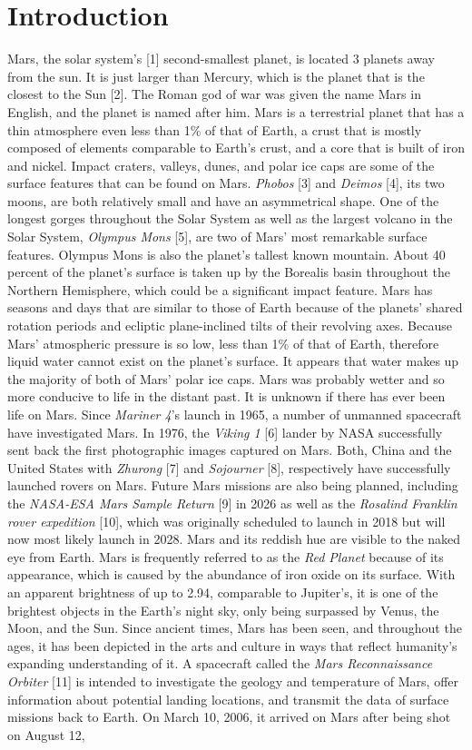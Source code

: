\documentclass[conference]{IEEEtran}
\begin{document}
\section{Introduction}
Mars, the solar system's [1] second-smallest planet, is located 3 planets away from the sun. It is just larger than Mercury, which is the planet that is the closest to the Sun [2]. The Roman god of war was given the name Mars in English, and the planet is named after him. Mars is a terrestrial planet that has a thin atmosphere even less than 1\% of that of Earth, a crust that is mostly composed of elements comparable to Earth's crust, and a core that is built of iron and nickel. Impact craters, valleys, dunes, and polar ice caps are some of the surface features that can be found on Mars. \textit{Phobos} [3] and \textit{Deimos} [4], its two moons, are both relatively small and have an asymmetrical shape. One of the longest gorges throughout the Solar System as well as the largest volcano in the Solar System, \textit{Olympus Mons} [5], are two of Mars' most remarkable surface features. Olympus Mons is also the planet's tallest known mountain. About 40 percent of the planet's surface is taken up by the Borealis basin throughout the Northern Hemisphere, which could be a significant impact feature. Mars has seasons and days that are similar to those of Earth because of the planets' shared rotation periods and ecliptic plane-inclined tilts of their revolving axes. Because Mars' atmospheric pressure is so low, less than 1\% of that of Earth, therefore liquid water cannot exist on the planet's surface. It appears that water makes up the majority of both of Mars' polar ice caps. Mars was probably wetter and so more conducive to life in the distant past. It is unknown if there has ever been life on Mars. Since \textit{Mariner 4}'s launch in 1965, a number of unmanned spacecraft have investigated Mars. In 1976, the \textit{Viking 1} [6] lander by NASA successfully sent back the first photographic images captured on Mars. Both, China and the United States with \textit{Zhurong} [7] and \textit{Sojourner} [8], respectively have successfully launched rovers on Mars. Future Mars missions are also being planned, including the \textit{NASA-ESA Mars Sample Return} [9] in 2026 as well as the \textit{Rosalind Franklin rover expedition} [10], which was originally scheduled to launch in 2018 but will now most likely launch in 2028. Mars and its reddish hue are visible to the naked eye from Earth. Mars is frequently referred to as the \textit{Red Planet} because of its appearance, which is caused by the abundance of iron oxide on its surface. With an apparent brightness of up to 2.94, comparable to Jupiter's, it is one of the brightest objects in the Earth's night sky, only being surpassed by Venus, the Moon, and the Sun. Since ancient times, Mars has been seen, and throughout the ages, it has been depicted in the arts and culture in ways that reflect humanity's expanding understanding of it. A spacecraft called the \textit{Mars Reconnaissance Orbiter} [11] is intended to investigate the geology and temperature of Mars, offer information about potential landing locations, and transmit the data of surface missions back to Earth. On March 10, 2006, it arrived on Mars after being shot on August 12, 
\end{document}
